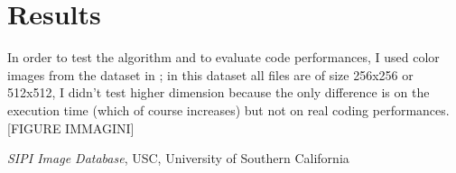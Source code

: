 \documentclass{report}
\begin{document}
\section{Results}
In order to test the algorithm and to evaluate code performances, I used color images from the dataset in \cite{SIPI}; in this dataset all files are of size 256x256 or 512x512, I didn't test higher dimension because the only difference is on the execution time (which of course increases) but not on real coding performances. [FIGURE IMMAGINI] 

\clearpage

\begin{thebibliography}{9}
		
		\textit{SIPI Image Database},
		USC, University of Southern California
	
\end{thebibliography}
\end{document}
